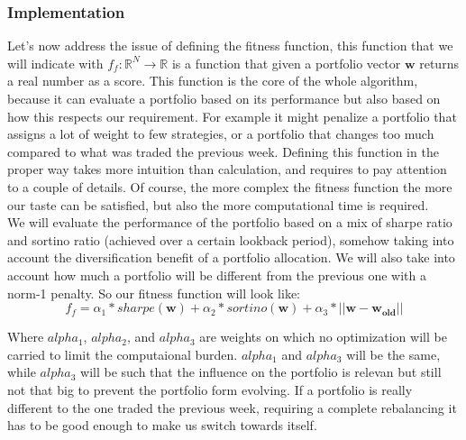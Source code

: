 \documentclass[a4paper]{article}
\numberwithin{equation}{subsection}
\begin{document}
\subsubsection*{Implementation}


Let's now address the issue of defining the fitness function, this function that we will indicate with $f_f: \mathbb{R}^N \rightarrow \mathbb{R}$ is a function that given a portfolio vector $\mathbf{w}$ returns a real number as a score. This function is the core of the whole algorithm, because it can evaluate a portfolio based on its performance but also based on how this respects our requirement. For example it might penalize a portfolio that assigns a lot of weight to few strategies, or a portfolio that changes too much compared to what was traded the previous week. Defining this function in the proper way takes more intuition than calculation, and requires to pay attention to a couple of details. Of course, the more complex the fitness function the more our taste can be satisfied, but also the more computational time is required.\\
We will evaluate the performance of the portfolio based on a mix of sharpe ratio and sortino ratio (achieved over a certain lookback period), somehow taking into account the diversification benefit of a portfolio allocation. We will also take into account how much a portfolio will be different from the previous one with a norm-1 penalty.
So our fitness function will look like:\\

$$
f_f = \alpha_1*sharpe(\mathbf{w}) + \alpha_2*sortino(\mathbf{w}) + \alpha_3*||\mathbf{w} - \mathbf{w_{old}}||
$$

Where $alpha_1$, $alpha_2$, and $alpha_3$ are weights on which no optimization will be carried to limit the computaional burden. $alpha_1$ and $alpha_3$ will be the same, while $alpha_3$ will be such that the influence on the portfolio is relevan but still not that big to prevent the portfolio form evolving. If a portfolio is really different to the one traded the previous week, requiring a complete rebalancing it has to be good enough to make us switch towards itself. 

\\
\\
\end{document}
